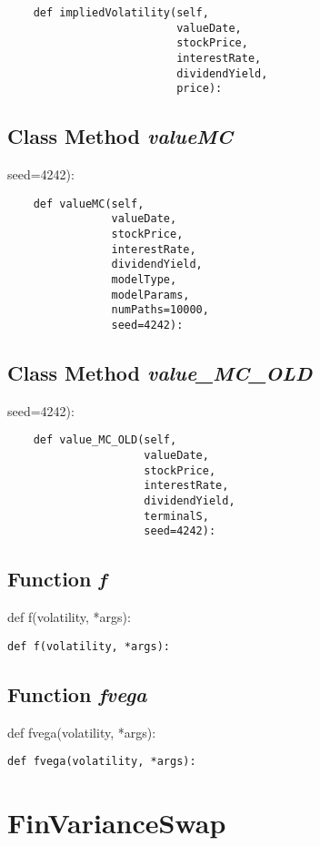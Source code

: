 \documentclass[twoside,11pt]{book}
\begin{document}
\begin{lstlisting}
    def impliedVolatility(self,
                          valueDate,
                          stockPrice,
                          interestRate,
                          dividendYield,
                          price):
\end{lstlisting}

\subsection{Class Method {\it valueMC}}
seed=4242):

\begin{lstlisting}
    def valueMC(self,
                valueDate,
                stockPrice,
                interestRate,
                dividendYield,
                modelType,
                modelParams,
                numPaths=10000,
                seed=4242):
\end{lstlisting}

\subsection{Class Method {\it value\_MC\_OLD}}
seed=4242):

\begin{lstlisting}
    def value_MC_OLD(self,
                     valueDate,
                     stockPrice,
                     interestRate,
                     dividendYield,
                     terminalS,
                     seed=4242):
\end{lstlisting}

\subsection{Function {\it f}}
def f(volatility, *args):

\begin{lstlisting}
def f(volatility, *args):
\end{lstlisting}

\subsection{Function {\it fvega}}
def fvega(volatility, *args):

\begin{lstlisting}
def fvega(volatility, *args):
\end{lstlisting}

\newpage
\section{FinVarianceSwap}
\end{document}
